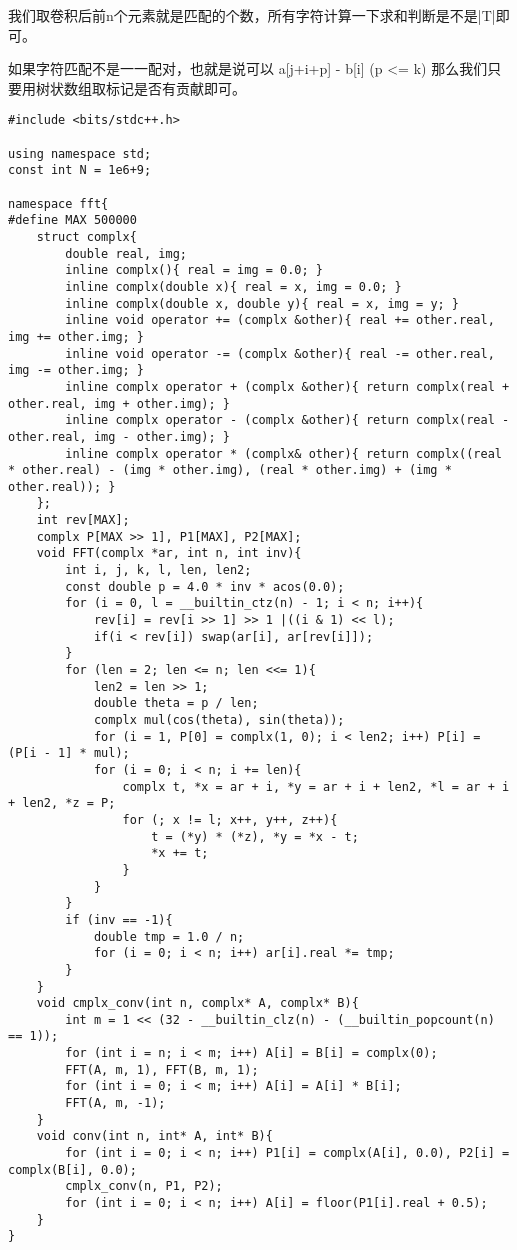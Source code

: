 我们取卷积后前n个元素就是匹配的个数，所有字符计算一下求和判断是不是|T|即可。

如果字符匹配不是一一配对，也就是说可以 a[j+i+p] - b[i] (p <= k) 那么我们只要用树状数组取标记是否有贡献即可。

\begin{lstlisting}
#include <bits/stdc++.h>

using namespace std;
const int N = 1e6+9;

namespace fft{
#define MAX 500000
    struct complx{
        double real, img;
        inline complx(){ real = img = 0.0; }
        inline complx(double x){ real = x, img = 0.0; }
        inline complx(double x, double y){ real = x, img = y; }
        inline void operator += (complx &other){ real += other.real, img += other.img; }
        inline void operator -= (complx &other){ real -= other.real, img -= other.img; }
        inline complx operator + (complx &other){ return complx(real + other.real, img + other.img); }
        inline complx operator - (complx &other){ return complx(real - other.real, img - other.img); }
        inline complx operator * (complx& other){ return complx((real * other.real) - (img * other.img), (real * other.img) + (img * other.real)); }
    };
    int rev[MAX];
    complx P[MAX >> 1], P1[MAX], P2[MAX];
    void FFT(complx *ar, int n, int inv){
        int i, j, k, l, len, len2;
        const double p = 4.0 * inv * acos(0.0);
        for (i = 0, l = __builtin_ctz(n) - 1; i < n; i++){
            rev[i] = rev[i >> 1] >> 1 |((i & 1) << l);
            if(i < rev[i]) swap(ar[i], ar[rev[i]]);
        }
        for (len = 2; len <= n; len <<= 1){
            len2 = len >> 1;
            double theta = p / len;
            complx mul(cos(theta), sin(theta));
            for (i = 1, P[0] = complx(1, 0); i < len2; i++) P[i] = (P[i - 1] * mul);
            for (i = 0; i < n; i += len){
                complx t, *x = ar + i, *y = ar + i + len2, *l = ar + i + len2, *z = P;
                for (; x != l; x++, y++, z++){
                    t = (*y) * (*z), *y = *x - t;
                    *x += t;
                }
            }
        }
        if (inv == -1){
            double tmp = 1.0 / n;
            for (i = 0; i < n; i++) ar[i].real *= tmp;
        }
    }
    void cmplx_conv(int n, complx* A, complx* B){
        int m = 1 << (32 - __builtin_clz(n) - (__builtin_popcount(n) == 1));
        for (int i = n; i < m; i++) A[i] = B[i] = complx(0);
        FFT(A, m, 1), FFT(B, m, 1);
        for (int i = 0; i < m; i++) A[i] = A[i] * B[i];
        FFT(A, m, -1);
    }
    void conv(int n, int* A, int* B){
        for (int i = 0; i < n; i++) P1[i] = complx(A[i], 0.0), P2[i] = complx(B[i], 0.0);
        cmplx_conv(n, P1, P2);
        for (int i = 0; i < n; i++) A[i] = floor(P1[i].real + 0.5);
    }
}


\end{lstlisting}
